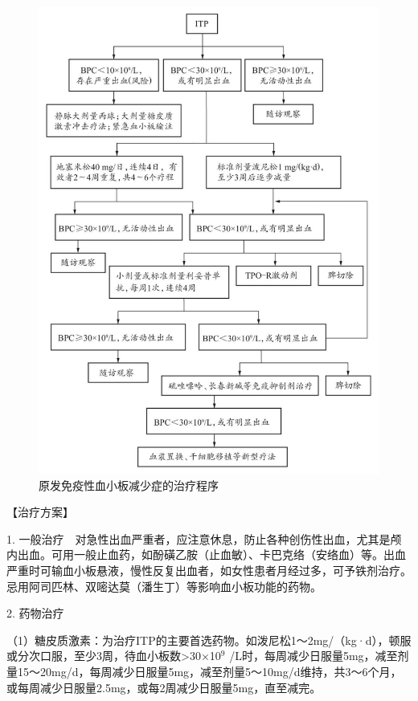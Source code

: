 \begin{figure}[!htbp]
 \centering
 \includegraphics{./images/Image00169.jpg}
 \captionsetup{justification=centering}
 \caption{原发免疫性血小板减少症的治疗程序}
 \label{fig5-5-1}
  \end{figure} 

【治疗方案】

1.
一般治疗　对急性出血严重者，应注意休息，防止各种创伤性出血，尤其是颅内出血。可用一般止血药，如酚磺乙胺（止血敏）、卡巴克络（安络血）等。出血严重时可输血小板悬液，慢性反复出血者，如女性患者月经过多，可予铁剂治疗。忌用阿司匹林、双嘧达莫（潘生丁）等影响血小板功能的药物。

2. 药物治疗

（1）糖皮质激素：为治疗ITP的主要首选药物。如泼尼松1～2mg/（kg·d），顿服或分次口服，至少3周，待血小板数\textgreater{}30×10$^{9}$
/L时，每周减少日服量5mg，减至剂量15～20mg/d，每周减少日服量5mg，减至剂量5～10mg/d维持，共3～6个月，或每周减少日服量2.5mg，或每2周减少日服量5mg，直至减完。

